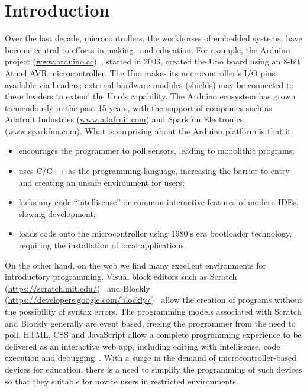 \section{Introduction}
\label{sec:intro}

Over the last decade, microcontrollers, the workhorses of embedded systems, have become
central to efforts in making~\cite{dougherty2012maker} and education. For example, the Arduino project
(\url{www.arduino.cc})~\cite{buildingArduino2014},
started in 2003, created the Uno board using an 8-bit Atmel
AVR microcontroller. The Uno makes its microcontroller's I/O pins available via headers;
external hardware modules (shields) may be connected to these headers to extend
the Uno's capability. The Arduino ecosystem has grown tremendously in the past 15 years,
with the support of companies such as Adafruit Industries (\url{www.adafruit.com}) and
Sparkfun Electronics (\url{www.sparkfun.com}). What is surprising about the Arduino platform is that
it:
\begin{itemize}
\item encourages the programmer to poll sensors, leading to monolithic programs;
\item uses C/C++ as the programming language, increasing the barrier to entry and creating an unsafe environment for users;
\item lacks any code ``intellisense'' or common interactive features of modern IDEs, slowing development;
\item loads code onto the microcontroller using 1980's era bootloader technology, requiring the installation of local applications.
\end{itemize}
On the other hand, on the web we find many excellent environments for introductory programming.
Visual block editors such as Scratch (\url{https://scratch.mit.edu/})~\cite{ScratchCACM2009,BlocksBeyondCACM2017}
and Blockly (\url{https://developers.google.com/blockly/})~\cite{Blocky2015}
allow the creation of programs without the possibility of syntax errors.
The programming models associated with Scratch and Blockly generally are
event based, freeing the programmer from the need to poll.
HTML, CSS and JavaScript allow a complete programming experience to be delivered as an interactive
web app, including editing with intellisense, code execution and debugging~\cite{Monaco}. With a surge
in the demand of microcontroller-based devices for education, there is a need to simplify the programming of such devices so that they suitable for novice users in restricted environments.

